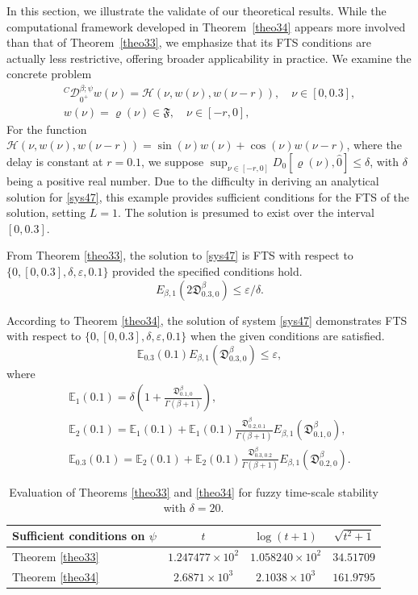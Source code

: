 \documentclass[reqno]{amsart}
\begin{document}
In this section, we illustrate the validate of our theoretical results. 
While the computational framework developed in Theorem~\ref{theo34} appears more 
involved than that of Theorem~\ref{theo33}, we emphasize that its FTS conditions 
are actually less restrictive, offering broader applicability in practice.
We examine the concrete problem
\begin{equation} \label{sys47}
\begin{gathered}
{ }^C \mathcal{D}_{0^{+}}^{\beta ; \psi} w(\nu )=\mathcal{H}(\nu , w(\nu ),
w(\nu - r)), \quad \nu \in[0,0.3], \\
 w(\nu )=\varrho(\nu ) \in \mathfrak{F}, \quad \nu \in[- r, 0],
\end{gathered}
\end{equation}
For the function $\mathcal{H}(\nu , w(\nu ), w(\nu - r)) = \sin(\nu ) w(\nu )
+ \cos(\nu ) w(\nu - r)$, where the delay is constant at $ r = 0.1$, we suppose
$\sup_{\nu \in [- r, 0]} D_0[\varrho(\nu ), \hat{0}] \leq \delta$, with $\delta$
being a positive real number. Due to the difficulty in deriving an analytical
solution for \eqref{sys47}, this example provides sufficient conditions for the FTS
of the solution, setting $L = 1$. The solution is presumed to exist over the interval
$[0, 0.3]$.

 From Theorem \ref{theo33}, the solution to \eqref{sys47} is FTS with respect to 
 $ \{0, [0, 0.3], \delta, \varepsilon, 0.1\}$ provided the specified conditions hold.
$$
E_{\beta, 1}(2\mathfrak{D}_{0.3,0}^{\beta}) \leq \varepsilon / \delta .
$$

According to Theorem \ref{theo34}, the solution of system \eqref{sys47} demonstrates 
FTS with respect to $\{0, [0, 0.3], \delta, \varepsilon, 0.1\}$ when the given 
conditions are satisfied.
$$
\mathbb{E}_{0.3}(0.1) E_{\beta, 1}(\mathfrak{D}_{0.3,0}^{\beta}) \leq \varepsilon,
$$
where
\begin{gather*}
 \mathbb{E}_{1}(0.1)=\delta(1+\frac{\mathfrak{D}_{0.1,0}^{\beta}}{\Gamma(\beta+1)}), \\
 \mathbb{E}_{2}(0.1)=\mathbb{E}_{1}(0.1)+\mathbb{E}_{1}(0.1) \frac{\mathfrak{D}_{0.2,0.1}^{\beta}}{\Gamma(\beta+1)} E_{\beta, 1}(\mathfrak{D}_{0.1,0}^{\beta}), \\
 \mathbb{E}_{0.3}(0.1)=\mathbb{E}_{2}(0.1)+\mathbb{E}_{2}(0.1) \frac{\mathfrak{D}_{0.3,0.2}^{\beta}}{\Gamma(\beta+1)} E_{\beta, 1}(\mathfrak{D}_{0.2,0}^{\beta}).
\end{gather*}


\begin{table}[htb]
\centering
\caption{Evaluation of Theorems \ref{theo33} and \ref{theo34} for fuzzy time-scale 
stability with $\delta = 20$.}
\label{table1}
\begin{tabular}{|lccc|}
\hline
\textbf{Sufficient conditions on $\psi$} & $t$ & $\log (t+1)$ & $\sqrt{t^{2}+1}$ \\
\hline
Theorem \ref{theo33} & $1.247477 \times 10^{2}$ & $1.058240 \times 10^{2}$ & $34.51709$ \\
Theorem \ref{theo34} & $2.6871 \times 10^{3}$ & $2.1038 \times 10^{3}$ & $161.9795$ \\
\hline
\end{tabular}
\end{table}
\end{document}
